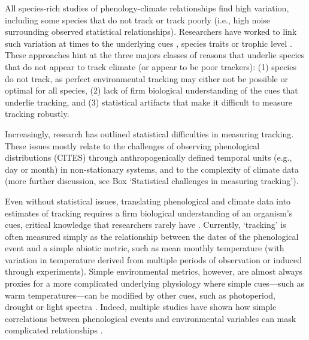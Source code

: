 \documentclass[11pt,letterpaper]{article}
\begin{document}
All species-rich studies of phenology-climate relationships find high variation, including some species that do not track or track poorly (i.e., high noise surrounding observed statistical relationships). Researchers have worked to link such variation at times to the underlying cues \citep[e.g.,][]{Cook:2012pnas}, species traits \citep[e.g.,][]{cohen2018} or trophic level \citep[e.g.,][]{thackeray2016}. These approaches hint at the three majors classes of reasons that underlie species that do not appear to track climate (or appear to be poor trackers): (1) species do not track, as perfect environmental tracking may either not be possible or optimal for all species, (2) lack of firm biological understanding of the cues that underlie tracking, and (3) statistical artifacts that make it difficult to measure tracking robustly. 

Increasingly, research has outlined statistical difficulties in measuring tracking. These issues mostly relate to the challenges of observing phenological distributions (CITES) through anthropogenically defined temporal units (e.g., day or month) in non-stationary systems, and to the complexity of climate data (more further discussion, see Box `Statistical challenges in measuring tracking'). 

Even without statistical issues, translating phenological and climate data into estimates of tracking requires a firm biological understanding of an organism's cues, critical knowledge that researchers rarely have \citep{chmura2019}. Currently, `tracking' is often measured simply as the relationship between the dates of the phenological event and a simple abiotic metric, such as mean monthly temperature (with variation in temperature derived from multiple periods of observation or induced through experiments). Simple environmental metrics, however, are almost always proxies for a more complicated underlying physiology where simple cues---such as warm temperatures---can be modified by other cues, such as photoperiod, drought or light spectra \citep{Bagnall1993,Stinchcombe:2004ec}. Indeed, multiple studies have shown how simple correlations between phenological events and environmental variables can mask complicated relationships \citep{Cook:2012pnas,tansey2017}. %
\end{document}
